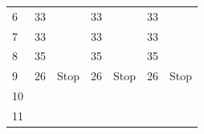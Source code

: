\begin{table}[!ht]
\begin{tabular}{lllllll}
		\multicolumn{1}{l|}{6}  & \cellcolor[HTML]{F8FF00}33   & \multicolumn{1}{l|}{\cellcolor[HTML]{F8FF00}}      & \cellcolor[HTML]{F8FF00}33    & \multicolumn{1}{l|}{\cellcolor[HTML]{F8FF00}}      & \cellcolor[HTML]{F8FF00}33 & \cellcolor[HTML]{F8FF00}      \\
		\multicolumn{1}{l|}{7}  & \cellcolor[HTML]{F8FF00}33   & \multicolumn{1}{l|}{\cellcolor[HTML]{F8FF00}}      & \cellcolor[HTML]{F8FF00}33    & \multicolumn{1}{l|}{\cellcolor[HTML]{F8FF00}}      & \cellcolor[HTML]{F8FF00}33 & \cellcolor[HTML]{F8FF00}      \\
		\multicolumn{1}{l|}{8}  & \cellcolor[HTML]{F8FF00}35   & \multicolumn{1}{l|}{\cellcolor[HTML]{F8FF00}}      & \cellcolor[HTML]{F8FF00}35    & \multicolumn{1}{l|}{\cellcolor[HTML]{F8FF00}}      & \cellcolor[HTML]{F8FF00}35 & \cellcolor[HTML]{F8FF00}      \\
		\multicolumn{1}{l|}{9}  & \cellcolor[HTML]{FD6864}26   & \multicolumn{1}{l|}{\cellcolor[HTML]{FD6864}Stop}  & \cellcolor[HTML]{FD6864}26    & \multicolumn{1}{l|}{\cellcolor[HTML]{FD6864}Stop}  & \cellcolor[HTML]{FD6864}26 & \cellcolor[HTML]{FD6864}Stop  \\
		\multicolumn{1}{l|}{10} &                              & \multicolumn{1}{l|}{}                              &                               & \multicolumn{1}{l|}{}                              &                            &                               \\
		\multicolumn{1}{l|}{11} &                              & \multicolumn{1}{l|}{}                              &                               & \multicolumn{1}{l|}{}                              &                            &                               \\ \hline
	\end{tabular}
\end{table}
\pagebreak[1]

